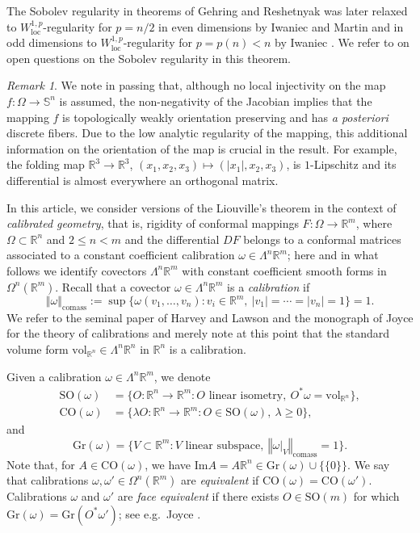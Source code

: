 \documentclass[a4paper,leqno,11pt]{amsart}
\numberwithin{equation}{section}
\theoremstyle{remark}
\newtheorem*{remark*}{Remark}
\theoremstyle{remark}
\newcommand{\R}{\mathbb{R}}
\DeclareMathOperator{\loc}{loc}
\newcommand{\norm}[1]{ \left\Vert #1 \right\Vert }	%
\newcommand{\vol}{\mathrm{vol}}
\newcommand{\bS}{\mathbb{S}}
\newcommand{\comass}{\mathrm{comass}}
\newcommand{\Gr}{\mathrm{Gr}}
\newcommand{\SO}{\mathrm{SO}}
\newcommand{\CO}{\mathrm{CO}}
\begin{document}
The Sobolev regularity in theorems of Gehring and Reshetnyak was later relaxed to $W^{1,p}_{\loc}$-regularity for $p=n/2$ in even dimensions by Iwaniec and Martin \cite{Iwa:Mar:93} and in odd dimensions to $W^{1,p}_{\loc}$-regularity for $p=p(n)<n$ by Iwaniec \cite{Iwa:92}. We refer to \cite{Iw:Ma:01} on open questions on the Sobolev regularity in this theorem. 


\begin{remark*}
We note in passing that, although no local injectivity on the map $f \colon \Omega \to \bS^n$ is assumed, the non-negativity of the Jacobian implies that the mapping $f$ is topologically weakly orientation preserving and has \emph{a posteriori} discrete fibers. Due to the low analytic regularity of the mapping, this additional information on the orientation of the map is crucial in the result. For example, the folding map $\R^3 \to \R^3$, $(x_1,x_2,x_3) \mapsto (|x_1|, x_2,x_3)$, is $1$-Lipschitz and its differential is almost everywhere an orthogonal matrix.
\end{remark*}



In this article, we consider versions of the Liouville's theorem in the context of \emph{calibrated geometry}, that is, rigidity of conformal mappings $F \colon \Omega \to \R^m$, where $\Omega \subset \R^n$ and $2\le n < m$ and the differential $DF$ belongs to a conformal matrices associated to a constant coefficient calibration $\omega\in \Lambda^n \R^m$; here and in what follows we identify covectors $\Lambda^n \R^m$ with constant coefficient smooth forms in $\Omega^n(\R^m)$. Recall that a covector $\omega\in \Lambda^n \R^m$ is a \emph{calibration} if
\[
\norm{\omega}_\comass := \sup\{ \omega(v_1,\ldots,v_n) \colon v_i \in \R^m,\ |v_1|=\cdots=|v_n| = 1\} = 1.
\]
We refer to the seminal paper of Harvey and Lawson \cite{Har:Law:82} and the monograph of Joyce \cite{Joy:07} for the theory of calibrations and merely note at this point that the standard volume form $\vol_{\R^n}\in \Lambda^n \R^n$ in $\R^n$ is a calibration.


Given a calibration $\omega \in \Lambda^n \R^m$, we denote
\begin{align*}
\SO(\omega) &= \{ O \colon \R^n \to \R^m \colon O \text{ linear isometry},\ O^*\omega = \vol_{\R^n} \},\\
\CO(\omega) &= \{ \lambda O \colon \R^n \to \R^m \colon O \in \SO(\omega),\ \lambda \ge 0\},
\end{align*}
and
\[
\Gr(\omega) = \{ V \subset \R^m \colon V \text{ linear subspace},\ \norm{\omega|_V}_{\comass} = 1 \}.
\]
Note that, for $A \in \CO(\omega)$, we have $\mathrm{Im}A = A\R^n \in \Gr(\omega)\cup \{\{ 0 \}\}$. We say that
calibrations $\omega, \omega' \in \Omega^n( \mathbb{R}^m )$ are \emph{equivalent} if $\CO(\omega) = \CO(\omega')$. Calibrations $\omega$ and $\omega'$ are \emph{face equivalent} if there exists $O \in \SO(m)$ for which $\Gr(\omega) = \Gr(O^*\omega')$; see e.g.~Joyce \cite[Section 4.3]{Joy:07}. 
\end{document}
